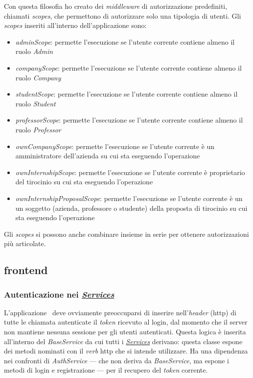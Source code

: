 Con questa filosofia ho creato dei \textit{middleware} di autorizzazione predefiniti, chiamati \textit{scopes}, che permettono di autorizzare solo una tipologia di utenti. Gli \textit{scopes} inseriti all'interno dell'applicazione sono:
\begin{itemize}[itemsep=0pt]
	\item \textit{adminScope}: permette l'esecuzione se l'utente corrente contiene almeno il ruolo \textit{Admin}
	\item \textit{companyScope}: permette l'esecuzione se l'utente corrente contiene almeno il ruolo \textit{Company}
	\item \textit{studentScope}: permette l'esecuzione se l'utente corrente contiene almeno il ruolo \textit{Student}
	\item \textit{professorScope}: permette l'esecuzione se l'utente corrente contiene almeno il ruolo \textit{Professor}
	\item \textit{ownCompanyScope}: permette l'esecuzione se l'utente corrente è un amministratore dell'azienda su cui sta eseguendo l'operazione
	\item \textit{ownInternshipScope}: permette l'esecuzione se l'utente corrente è proprietario del tirocinio su cui sta eseguendo l'operazione
	\item \textit{ownInternshipProposalScope}: permette l'esecuzione se l'utente corrente è un un soggetto (azienda, professore o studente) della proposta di tirocinio su cui sta eseguendo l'operazione
\end{itemize}
Gli \textit{scopes} si possono anche combinare insieme in serie per ottenere autorizzazioni più articolate.

\subsection{\Gls{frontend}}
\label{chap:client:authentication}
\subsubsection{Autenticazione nei \textit{\hyperref[client:services]{Services}}}
L'applicazione \angular~deve ovviamente preoccuparsi di inserire nell'\textit{header} (\acrshort{http}) di tutte le chiamata autenticate il \textit{token} ricevuto al login, dal momento che il server non mantiene nessuna sessione per gli utenti autenticati. Questa logica è inserita all'interno del \textit{BaseService} da cui tutti i \textit{\hyperref[client:services]{Services}} derivano: questa classe espone dei metodi nominati con il \textit{verb} \acrshort{http} che si intende utilizzare. Ha una dipendenza nei confronti di \textit{AuthService} --- che non deriva da \textit{BaseService}, ma espone i metodi di login e registrazione --- per il recupero del \textit{token} corrente.

